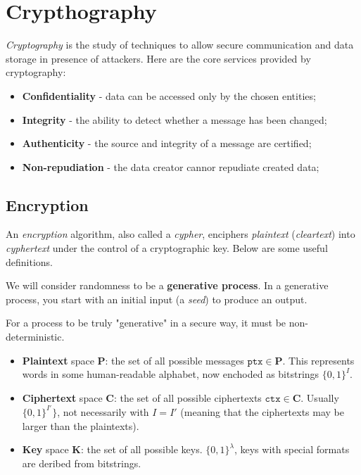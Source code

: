 \section{Crypthography}

\textit{Cryptography} is the study of techniques to allow secure communication and data storage in presence of attackers. Here are the core services provided by cryptography:

\begin{itemize}
	\item \textbf{Confidentiality} - data can be accessed only by the chosen entities;
	\item \textbf{Integrity} - the ability to detect whether a message has been changed;
	\item \textbf{Authenticity} - the source and integrity of a message are certified;
	\item \textbf{Non-repudiation} - the data creator cannor repudiate created data;
\end{itemize}

\subsection{Encryption}

An \textit{encryption} algorithm, also called a \textit{cypher}, enciphers \textit{plaintext} (\textit{cleartext}) into \textit{cyphertext} under the control of a cryptographic key. Below are some useful definitions.

\begin{tcolorbox}[title = Definition: Randomness]
	We will consider randomness to be a \textbf{generative process}. In a generative process, you start with an initial input (a \textit{seed}) to produce an output.

	For a process to be truly "generative" in a secure way, it must be non-deterministic.
\end{tcolorbox}

\begin{tcolorbox}[title = Definition: Data]
	\begin{itemize}
		\item \textbf{Plaintext} space $\mathbf P$: the set of all possible messages $\texttt{ptx} \in \mathbf P$. This represents words in some human-readable alphabet, now enchoded as bitstrings $\{ 0, 1 \}^I$.
		\item \textbf{Ciphertext} space $\mathbf C$: the set of all possible ciphertexts $\texttt{ctx} \in \mathbf C$. Usually $\{ 0, 1 \}^{I'} \}$, not necessarily with $I = I'$ (meaning that the ciphertexts may be larger than the plaintexts).
		\item \textbf{Key} space $\mathbf K$: the set of all possible keys. $\{ 0, 1 \}^\lambda$, keys with special formats are deribed from bitstrings.
	\end{itemize}
\end{tcolorbox}

